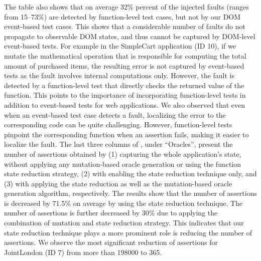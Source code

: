 The table also shows that on average 32\% percent of the injected faults (ranges from 15--73\%) are detected by function-level test cases, but not by our DOM event-based test cases. This shows that a considerable number of faults do not propagate to observable DOM states, and thus cannot be captured by DOM-level event-based tests. 
For example in the SimpleCart application (ID 10), if we mutate the mathematical operation that is responsible for computing the total amount of purchased items, the resulting error is not captured by event-based tests as the fault involves internal computations only. However, the fault is detected by a function-level test that directly checks the returned value of the function.
This points to the importance of incorporating function-level tests in addition to event-based tests for \javascript web applications. We also observed that even when an event-based test case detects a \javascript fault, localizing the error to the corresponding \javascript code can be quite challenging. However, function-level tests pinpoint the  corresponding function when an assertion fails, making it easier to localize the fault. 
The last three columns of , under ``Oracles'', present the number of assertions obtained by (1) capturing the whole application's state,  without applying any mutation-based oracle generation or using the function state reduction strategy, (2) with enabling the state reduction technique only, and (3) with applying the state reduction as well as the mutation-based oracle generation algorithm, respectively. 
The results show that the number of assertions is decreased by 71.5\% on average by using the state reduction technique. The number of assertions is further decreased by 30\% due to applying the combination of mutation and state reduction strategy.
This indicates that our state reduction technique plays a more prominent role is reducing the number of assertions. 
We observe the most significant reduction of assertions for JointLondon (ID 7) from more than 198000 to 365. 

